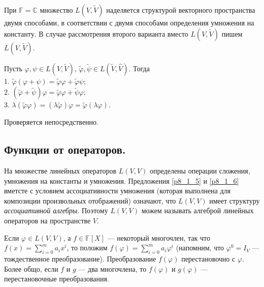 \otstup

При $\mathbb{F} = \mathbb{C}$ множество $L(V, \widetilde{V})$ наделяется структурой
векторного пространства двумя способами, в соответствии с двумя способами определения 
умножения на константу. В случае рассмотрения второго варианта 
вместо $L(V, \widetilde{V})$ пишем $\overline{L}(V, \widetilde{V})$.


\begin{predl}\label{p8_1_6}
Пусть $\varphi, \psi \in L(V, \widetilde{V})$,
$\widetilde{\varphi}, \widetilde{\psi} \in L(\widetilde{V}, \widehat{V})$.
Тогда\\
1. $\widetilde{\varphi} (\varphi + \psi) = \widetilde{\varphi} \varphi + \widetilde{\varphi}
\psi$;\\
2. $(\widetilde{\varphi} +\widetilde{\psi}) \varphi  =
\widetilde{\varphi} \varphi +\widetilde{\psi} \varphi $;\\
3. $\lambda (\widetilde{\varphi} \varphi) = (\lambda \widetilde{\varphi}) \varphi =
\widetilde{\varphi} (\lambda \varphi)$.
\end{predl}
\dok  Проверяется непосредственно.
\edok





\subsection{Функции от операторов.}

На множестве линейных операторов $L(V, V)$ определены операции 
сложения, умножения на константы и умножения. Предложения \ref{p8_1_5} и \ref{p8_1_6}
вметсте с условием ассоциативности умножения (которая выполнена для композиции произвольных отображений)
означают, что $L(V, V)$ имеет структуру {\it ассоциативной алгебры}.
Поэтому $L(V, V)$ можем называть алгеброй линейных операторов на пространстве $V$.

Если $\varphi \in L(V, V)$, а $f\in \mathbb{F}[X]$ --- некоторый многочлен,
так что $f(x) = \sum \limits_{i=0}^{m}a_ix^i$,
то положим $f(\varphi) = \sum \limits_{i=0}^{m}a_i \varphi^i$ (напомним, что $\varphi ^0 = I_V$ --- тождественное
преобразование).
Преобразование $f(\varphi)$ перестановочно с $\varphi$.
Более общо, если $f$ и $g$ --- два многочлена, то $f(\varphi)$ и $g(\varphi)$ ---
перестановочные преобразования.


